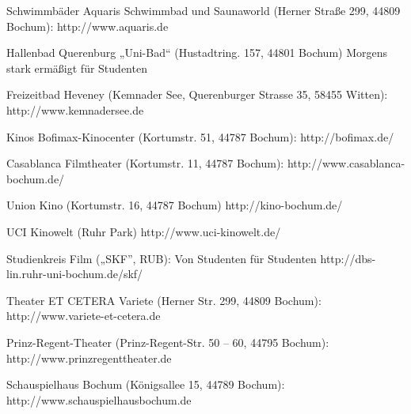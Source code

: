 Schwimmbäder
Aquaris Schwimmbad und Saunaworld (Herner Straße 299, 44809 Bochum):
http://www.aquaris.de

Hallenbad Querenburg „Uni-Bad“ (Hustadtring. 157, 44801 Bochum)
Morgens stark ermäßigt für Studenten

Freizeitbad Heveney (Kemnader See, Querenburger Strasse 35, 58455 Witten): 
http://www.kemnadersee.de



Kinos
Bofimax-Kinocenter (Kortumstr. 51, 44787 Bochum):
http://bofimax.de/

Casablanca Filmtheater (Kortumstr. 11, 44787 Bochum):
http://www.casablanca-bochum.de/

Union Kino (Kortumstr. 16, 44787 Bochum)
http://kino-bochum.de/

UCI Kinowelt (Ruhr Park)
http://www.uci-kinowelt.de/

Studienkreis Film („SKF”, RUB):  Von Studenten für Studenten
http://dbs-lin.ruhr-uni-bochum.de/skf/

Theater
ET CETERA Variete (Herner Str. 299, 44809 Bochum):
http://www.variete-et-cetera.de

Prinz-Regent-Theater (Prinz-Regent-Str. 50 – 60, 44795 Bochum):
http://www.prinzregenttheater.de

Schauspielhaus Bochum (Königsallee 15, 44789 Bochum):
http://www.schauspielhausbochum.de